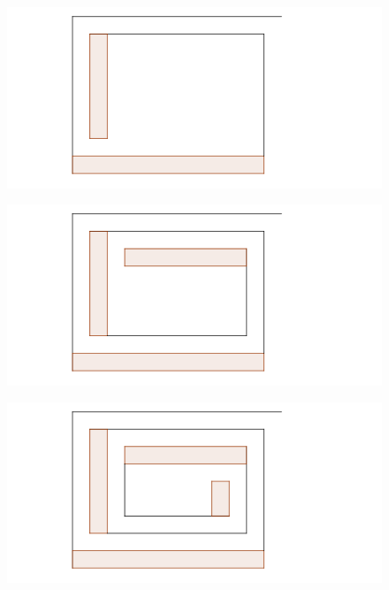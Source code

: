 \documentclass{beamer}
\begin{document}
\begin{frame}
\begin{figure}[h]
\includegraphics[width=\textwidth]{Caso-de-n-cuartos-steiner-2}
\end{figure}
\end{frame}
\begin{frame}
\begin{figure}[h]
\includegraphics[width=\textwidth]{Caso-de-n-cuartos-steiner-3}
\end{figure}
\end{frame}
\begin{frame}
\begin{figure}[h]
\includegraphics[width=\textwidth]{Caso-de-n-cuartos-steiner-4}
\end{figure}
\end{frame}
\end{document}
